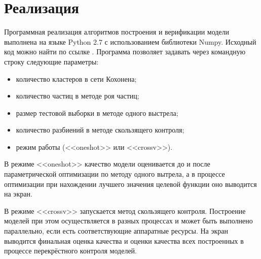 \section{Реализация}
Программная реализация алгоритмов построения и верификации модели выполнена на языке
Python 2.7 с использованием библиотеки Numpy. Исходный код можно найти по ссылке \cite{sources}.
Программа позволяет задавать через командную строку следующие параметры:
\begin{itemize}
  \item количество кластеров в сети Кохонена;
  \item количество частиц в методе роя частиц;
  \item размер тестовой выборки в методе одного выстрела;
  \item количество разбиений в методе скользящего контроля;
  \item режим работы (<<oneshot>>  или <<crossv>>).
\end{itemize}
\par
В режиме <<oneshot>> качество модели оценивается до и после параметрической
оптимизации по методу одного вытрела, а в процессе оптимизации при нахождении
лучшего значения целевой функции оно выводится на экран.
\par
В режиме <<crossv>> запускается метод скользящего контроля. Построение моделей при
этом осуществляется в разных процессах и может быть выполнено параллельно, если
есть соответствующие аппаратные ресурсы. На экран выводится финальная оценка качества и
оценки качества всех построенных в процессе перекрёстного контроля моделей.
